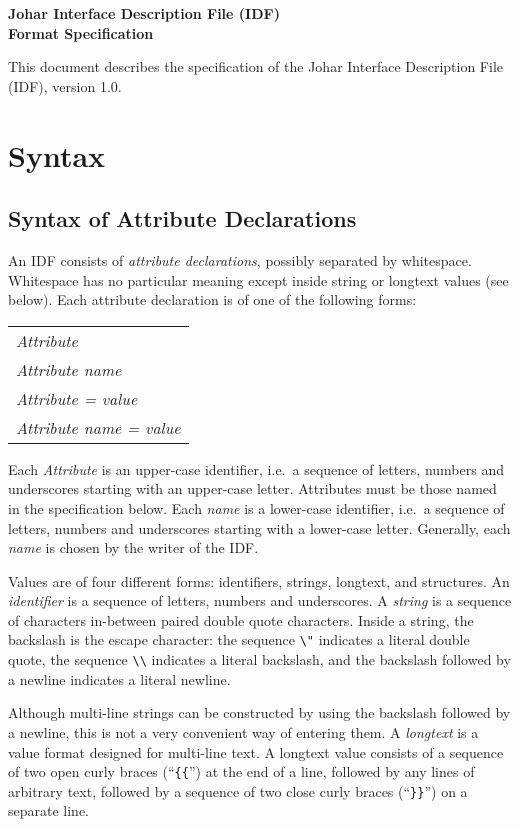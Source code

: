 \documentclass[11pt]{article}
\begin{document}
\begin{center} \bf \Large
Johar Interface Description File (IDF) \\
Format Specification
\end{center}

This document describes the specification of the Johar Interface
Description File (IDF), version 1.0.

\section{Syntax}

\subsection{Syntax of Attribute Declarations}

An IDF consists of {\it attribute declarations}, possibly
separated by whitespace.  Whitespace has no particular meaning
except inside string or longtext values (see below).
Each attribute declaration is of one of the following forms:
\begin{center}
\begin{tabular}{l}
{\it Attribute} \\
{\it Attribute name} \\
{\it Attribute = value} \\
{\it Attribute name = value} \\
\end{tabular}
\end{center}
Each {\it Attribute} is an upper-case identifier, i.e.\ a
sequence of letters, numbers and underscores starting with an
upper-case letter.  Attributes must be those named in the
specification below.  Each {\it name} is a lower-case
identifier, i.e.\ a sequence of letters, numbers and underscores
starting with a lower-case letter.  Generally, each {\it name}
is chosen by the writer of the IDF.

Values are of four different forms: identifiers, strings,
longtext, and structures.  An {\it identifier} is a
sequence of letters, numbers and underscores.  A {\it string}
is a sequence of characters in-between paired double quote
characters.  Inside a string, the backslash is the escape
character:  the sequence \verb^\"^ indicates a literal double
quote, the sequence \verb^\\^ indicates a literal backslash,
and the backslash followed by a newline indicates a literal
newline.

Although multi-line strings can be constructed by using the
backslash followed by a newline, this is not a very convenient
way of entering them.  A {\it longtext} is a value format
designed for multi-line text.  A longtext value consists of
a sequence of two open curly braces (``\verb/{{/'') at the end
of a line, followed by any lines of arbitrary text, followed by
a sequence of two close curly braces (``\verb/}}/'') on a
separate line.
\end{document}
